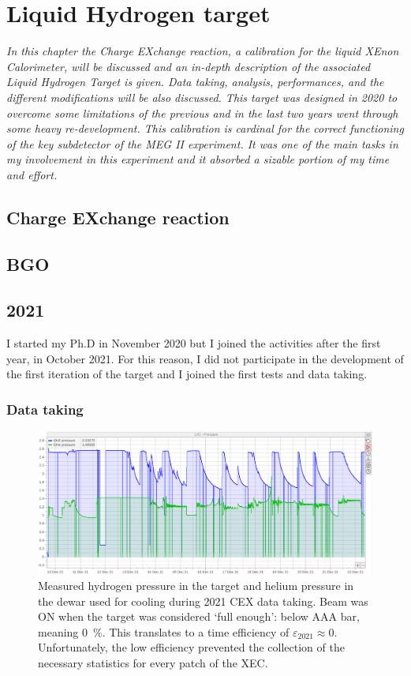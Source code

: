 \chapter{Liquid Hydrogen target}
\begin{refsection}
{\itshape In this chapter the Charge EXchange reaction, a calibration for the liquid XEnon Calorimeter, will be discussed and an in-depth description of the associated Liquid Hydrogen Target is given. 
Data taking, analysis, performances, and the different modifications will be also discussed.
This target was designed in 2020 to overcome some limitations of the previous and in the last two years went through some heavy re-development.
This calibration is cardinal for the correct functioning of the key subdetector of the MEG II experiment. It  was one of the main tasks in my involvement in this experiment and it absorbed a sizable portion of my time and effort.}
\section{Charge EXchange reaction}
\section{BGO}

\section{2021}
I started my Ph.D in November 2020 but I joined the activities after the first year, in October 2021. For this reason, I did not participate in the development of the first iteration of the target and I joined the first tests and data taking.

\subsection{Data taking}

\begin{figure}
    \centering
    \includegraphics[width = \textwidth]{Figures/LH2/2021CEX_LH2.png}
    \caption{Measured hydrogen pressure in the target and helium pressure in the dewar used for cooling during 2021 CEX data taking. 
    Beam was ON when the target was considered `full enough': below AAA bar, meaning \SI{0}{\%}. 
    This translates to a time efficiency of $\varepsilon_{2021}\approx0$. 
    Unfortunately, the low efficiency prevented the collection of the necessary statistics for every patch of the XEC.}
    \label{fig:CEX2021}
\end{figure}


\end{refsection}
